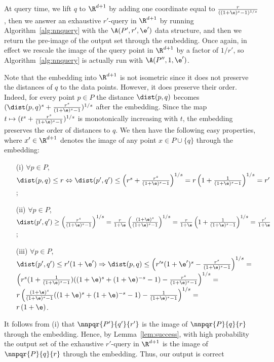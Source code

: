 At query time, we lift $q$ to $\R^{d+1}$ by adding one coordinate
equal to $\frac{r}{((1+\e)^s-1)^{1/s}}$, then we answer an exhaustive
$r'$-\pleb query in $\R^{d+1}$ by running Algorithm~\ref{alg:nnquery}
with the $\A(P', r', \e')$ data structure, and then we return the
pre-image of the output set through the embedding. Once again, in
effect we rescale the image of the query point in $\R^{d+1}$ by a
factor of $1/r'$, so Algorithm~\ref{alg:nnquery} is actually run
with $\A(P'', 1, \e')$.

Note that the embedding into $\R^{d+1}$ is not isometric since it
does not preserve the distances of $q$ to the data points. However, it
does preserve their order. Indeed, for every point $p\in P$ the distance
$\dist(p,q)$ becomes $(\dist(p,q)^s + \frac{r^s}{(1+\e)^s-1})^{1/s}$
after the embedding. Since the map
$t\mapsto (t^s + \frac{r^s}{(1+\e)^s-1})^{1/s}$ is monotonically
increasing with $t$, the embedding preserves the order of
distances to $q$. We then have the following easy properties, where $x'\in
\R^{d+1}$ denotes the image of any point $x\in P\cup\{q\}$ through the
embedding:
\begin{itemize}
\item[\rm (i)] $\forall p\in P$, $\dist(p,q)\leq r \Leftrightarrow
  \dist(p', q')\leq
  \left(r^s+\frac{r^s}{(1+\e)^s-1}\right)^{1/s}=r\left(1+\frac{1}{(1+\e)^s-1}\right)^{1/s} = r'$;
\item[\rm (ii)] $\forall p\in P$, $\dist(p', q')\geq
  \left(\frac{r^s}{(1+\e)^s-1}\right)^{1/s} =
  \frac{r}{1+\e}\left(\frac{(1+\e)^s}{(1+\e)^s-1}\right)^{1/s} = \frac{r}{1+\e}
  \left(1+\frac{1}{(1+\e)^s-1}\right)^{1/s} = \frac{r'}{1+\e}$;
\item[\rm (iii)] $\forall p\in P$, $\dist(p', q')\leq r'(1+\e')
  \Rightarrow \dist(p, q)\leq
  \left(r'^s(1+\e')^s-\frac{r^s}{(1+\e)^s-1}\right)^{1/s} =$\\$
  \left(r^s(1+\frac{1}{(1+\e)^s-1})((1+\e)^s + (1+\e)^{-s}
  -1)-\frac{r^s}{(1+\e)^s-1}\right)^{1/s} =$\\$ 
  r\left(\frac{(1+\e)^s}{(1+\e)^s-1}((1+\e)^s+(1+\e)^{-s}-1) - \frac{1}{(1+\e)^s-1}\right)^{1/s} =$\\$ r\left(1+\e\right)$.
\end{itemize}
It follows from (i) that $\nnpqr{P'}{q'}{r'}$ is the image of
$\nnpqr{P}{q}{r}$ through the embedding. Hence, by
Lemma~\ref{lem:success}, with high probability the output set of the
exhaustive $r'$-\pleb query in $\R^{d+1}$ is the image of
$\nnpqr{P}{q}{r}$ through the embedding. Thus, our output is correct
